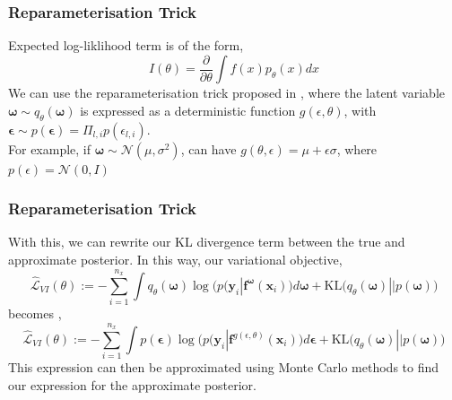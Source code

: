 \documentclass{beamer}
\newcommand{\mb}[1]{\mathbf{#1}}
\begin{document}
% 
% 
% 
% 
\begin{frame}
  \frametitle{Reparameterisation Trick}
  Expected log-liklihood term is of the form,
  \begin{equation*}
    I(\theta) = \dfrac{\partial}{\partial \theta} \int f(x) p_\theta(x) dx
  \end{equation*}
  We can use the reparameterisation trick proposed in \cite{kingma2013}, where the latent variable $\mb{\omega} \sim q_\theta(\mb{\omega})$ is expressed as a deterministic function $g(\epsilon, \theta)$, with $\mb{\epsilon} \sim p(\mb{\epsilon}) = \Pi_{l,i} p(\epsilon_{l,i})$.
  \\
  \vspace*{0.5cm}
  For example, if $\mb{\omega} \sim \mathcal{N}(\mu, \sigma^2)$, can have $g(\theta, \epsilon) = \mu + \epsilon \sigma$, where $p(\epsilon) = \mathcal{N}(0, I)$
\end{frame}
% 
% 
% 
% 
% 
\begin{frame}
  \frametitle{Reparameterisation Trick}
  With this, we can rewrite our KL divergence term between the true and approximate posterior. In this way, our variational objective,
  \begin{equation*}
    \hat{\mathcal{L}}_{VI}(\theta) := - \sum_{i=1}^{n_x}\int q_\theta (\mb{\omega})
    \log\Big( p(\mb{y}_i | \mb{f}^{\mb{\omega}}(\mb{x}_i) \Big) d\mb{\omega} +
    \text{KL}\Big( q_\theta (\mb{\omega}) || p (\mb{\omega}) \Big)
  \end{equation*}
  becomes \cite{gal2016},
  \begin{equation*}
    \hat{\mathcal{L}}_{VI}(\theta) := - \sum_{i=1}^{n_x}\int p(\mb{\epsilon})
    \log\Big( p(\mb{y}_i | \mb{f}^{g(\epsilon, \theta)} (\mb{x}_i) \Big) d\mb{\epsilon} +
    \text{KL}\Big( q_\theta (\mb{\omega}) || p (\mb{\omega}) \Big)
  \end{equation*}  
  This expression can then be approximated using Monte Carlo methods to find our expression for the approximate posterior.
\end{frame}
% 
% 
% 
% 
% 
\end{document}
